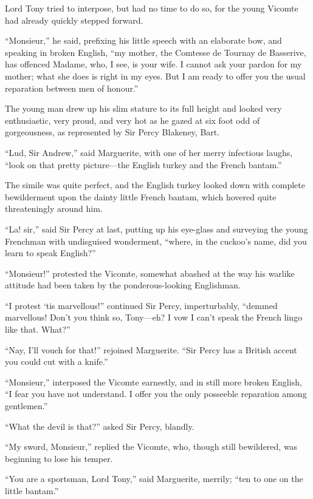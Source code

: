 Lord Tony tried to interpose, but had no time to do so, for the young Vicomte had already quickly stepped forward.

\enquote{Monsieur,} he said, prefixing his little speech with an elaborate bow, and speaking in broken English, \enquote{my mother, the Comtesse de Tournay de Basserive, has offenced Madame, who, I see, is your wife. I cannot ask your pardon for my mother; what she does is right in my eyes. But I am ready to offer you the usual reparation between men of honour.}

The young man drew up his slim stature to its full height and looked very enthusiastic, very proud, and very hot as he gazed at six foot odd of gorgeousness, as represented by Sir Percy Blakeney, Bart.

\enquote{Lud, Sir Andrew,} said Marguerite, with one of her merry infectious laughs, \enquote{look on that pretty picture---the English turkey and the French bantam.}

The simile was quite perfect, and the English turkey looked down with complete bewilderment upon the dainty little French bantam, which hovered quite threateningly around him.

\enquote{La! sir,} said Sir Percy at last, putting up his eye-glass and surveying the young Frenchman with undisguised wonderment, \enquote{where, in the cuckoo's name, did you learn to speak English?}

\enquote{Monsieur!} protested the Vicomte, somewhat abashed at the way his warlike attitude had been taken by the ponderous-looking Englishman.

\enquote{I protest `tis marvellous!} continued Sir Percy, imperturbably, \enquote{demmed marvellous! Don't you think so, Tony---eh? I vow I can't speak the French lingo like that. What?}

\enquote{Nay, I'll vouch for that!} rejoined Marguerite. \enquote{Sir Percy has a British accent you could cut with a knife.}

\enquote{Monsieur,} interposed the Vicomte earnestly, and in still more broken English, \enquote{I fear you have not understand. I offer you the only posseeble reparation among gentlemen.}

\enquote{What the devil is that?} asked Sir Percy, blandly.

\enquote{My sword, Monsieur,} replied the Vicomte, who, though still bewildered, was beginning to lose his temper.

\enquote{You are a sportsman, Lord Tony,} said Marguerite, merrily; \enquote{ten to one on the little bantam.}

